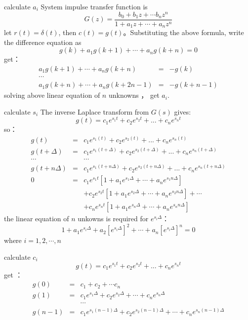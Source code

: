 \begin{frame}{calculate $a_i$}
System impulse transfer function is 
$$
G(z)=\frac{b_0+b_1 z+ \cdots b_n z^n}{1+a_1 z + \cdots + a_n z^n}
$$
let $r(t)=\delta(t)$, then $c(t)=g(t)$。Substituting the above formula, write the difference equation as
$$
g(k)+a_1g(k+1)+\cdots+a_ng(k+n) = 0
$$
get：
\begin{eqnarray*}
a_1g(k+1)+\cdots+a_ng(k+n) &=& -g(k) \\
\cdots &&  \\
a_1g(k+n)+\cdots+a_ng(k+2n-1) &=& -g(k+n-1)
\end{eqnarray*}
solving above linear equation of $n$ unknowns ， get $a_i$.
\end{frame}

\begin{frame}{calculate $s_i$}
The inverse Laplace transform from $G(s)$ gives:
$$
g(t)=c_1 e^{s_1 t} + c_2 e^{s_2 t} + ... + c_n e^{s_n t}
$$
so：
\begin{eqnarray*}
g(t) &=& c_1 e^{s_1 (t)} + c_2 e^{s_2 (t)} + ... + c_n e^{s_n (t)}  \\
g(t+\Delta) &=& c_1 e^{s_1 (t+\Delta)} + c_2 e^{s_2 (t+\Delta)} + ... + c_n e^{s_n (t+\Delta)}  \\
\cdots && \cdots \\
g(t+n\Delta) &=& c_1 e^{s_1 (t+n\Delta)} + c_2 e^{s_2 (t+n\Delta)} + ... + c_n e^{s_n (t+n\Delta)}  \\
0 &=& c_1 e ^{s_1 t}[1+a_1 e^{s_1 \Delta} + \cdots + a_n e^{s_1 n\Delta}]  \\
&& +c_2 e ^{s_2 t}[1+a_1 e^{s_2 \Delta} + \cdots + a_n e^{s_2 n\Delta}] +\cdots  \\
&& +c_n e ^{s_n t}[1+a_1 e^{s_n \Delta} + \cdots + a_n e^{s_n n\Delta}] 
\end{eqnarray*}
the linear equation of $n$ unkowns is required for  $e^{s_i\Delta}$：
$$
1+a_1 e^{s_i \Delta} +a_2 [e^{s_i\Delta}]^2+\cdots+a_n[e^{s_i\Delta}]^n=0
$$
where $i=1,2,\cdots,n$
\end{frame}

\begin{frame}{calculate $c_i$}
$$
g(t)=c_1 e^{s_1 t} + c_2 e^{s_2 t} + ... + c_n e^{s_n t}
$$
get ：
\begin{eqnarray*}
g(0)&=& c_1 + c_2 + \cdots c_n \\
g(1)&=& c_1 e^{s_1 \Delta} + c_2 e^{s_2 \Delta}+\cdots+c_n e^{s_n \Delta} \\
&& \cdots \\
g(n-1)&=& c_1 e^{s_1 (n-1)\Delta} + c_2 e^{s_2 (n-1)\Delta}+\cdots+c_n e^{s_n (n-1)\Delta} \\
\end{eqnarray*}
\end{frame}

